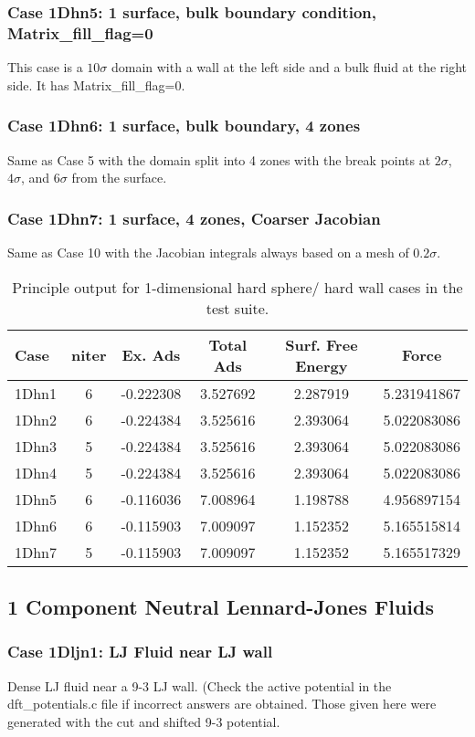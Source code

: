 \documentclass[10pt,onecolumn]{article}
\begin{document}
\subsubsection{Case 1Dhn5:  1 surface, bulk boundary condition, Matrix\_fill\_flag=0}
This case is a $10\sigma$ domain with a wall at the left side and a bulk fluid
at the right side.  It has Matrix\_fill\_flag=0.

\subsubsection{Case 1Dhn6:  1 surface, bulk boundary, 4 zones}
Same as Case 5 with the domain split into 4 zones with the break points
at $2\sigma$, $4\sigma$, and $6\sigma$ from the surface.

\subsubsection{Case 1Dhn7:  1 surface, 4 zones, Coarser Jacobian}
Same as Case 10 with the Jacobian integrals always based on a mesh of $0.2\sigma$.

\begin{table}[h]
\begin{tabular}{|l|c|c|c|c|c|}
\hline
Case & niter & Ex. Ads & Total Ads & Surf. Free Energy & Force \\
\hline
1Dhn1 & 6 & -0.222308 & 3.527692 & 2.287919 & 5.231941867 \\
1Dhn2 & 6 & -0.224384 & 3.525616 & 2.393064 & 5.022083086  \\
1Dhn3 & 5 & -0.224384 & 3.525616 & 2.393064 & 5.022083086 \\
1Dhn4 & 5 & -0.224384 & 3.525616 & 2.393064 & 5.022083086 \\
1Dhn5 & 6 & -0.116036 & 7.008964 & 1.198788 & 4.956897154 \\
1Dhn6 & 6 & -0.115903 & 7.009097 & 1.152352 & 5.165515814 \\
1Dhn7 & 5 & -0.115903 & 7.009097 & 1.152352 & 5.165517329 \\
\hline
\end{tabular}
\label{tab:table1}
\caption{Principle output for 1-dimensional hard sphere/ hard wall cases
in the test suite.}
\end{table}

\subsection{1 Component Neutral Lennard-Jones Fluids}
\subsubsection{Case 1Dljn1: LJ Fluid near LJ wall}
Dense LJ fluid near a 9-3 LJ wall.  (Check the active potential
in the dft\_potentials.c file if incorrect answers are obtained.  Those
given here were generated with the cut and shifted 9-3 potential.
\end{document}
